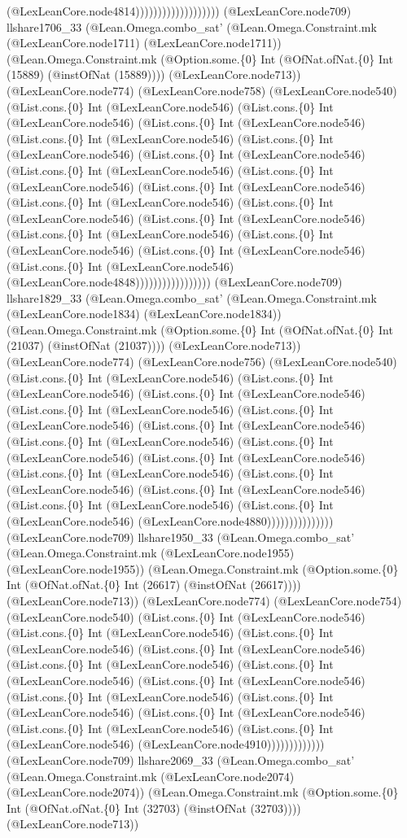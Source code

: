 \documentclass[11pt]{article}
\begin{document}
(@LexLeanCore.node4814))))))))))))))))))) (@LexLeanCore.node709) llshare1706\_33 (@Lean.Omega.combo\_sat' (@Lean.Omega.Constraint.mk (@LexLeanCore.node1711) (@LexLeanCore.node1711)) (@Lean.Omega.Constraint.mk (@Option.some.\{0\} Int (@OfNat.ofNat.\{0\} Int (15889) (@instOfNat (15889)))) (@LexLeanCore.node713)) (@LexLeanCore.node774) (@LexLeanCore.node758) (@LexLeanCore.node540) (@List.cons.\{0\} Int (@LexLeanCore.node546) (@List.cons.\{0\} Int (@LexLeanCore.node546) (@List.cons.\{0\} Int (@LexLeanCore.node546) (@List.cons.\{0\} Int (@LexLeanCore.node546) (@List.cons.\{0\} Int (@LexLeanCore.node546) (@List.cons.\{0\} Int (@LexLeanCore.node546) (@List.cons.\{0\} Int (@LexLeanCore.node546) (@List.cons.\{0\} Int (@LexLeanCore.node546) (@List.cons.\{0\} Int (@LexLeanCore.node546) (@List.cons.\{0\} Int (@LexLeanCore.node546) (@List.cons.\{0\} Int (@LexLeanCore.node546) (@List.cons.\{0\} Int (@LexLeanCore.node546) (@List.cons.\{0\} Int (@LexLeanCore.node546) (@List.cons.\{0\} Int (@LexLeanCore.node546) (@List.cons.\{0\} Int (@LexLeanCore.node546) (@List.cons.\{0\} Int (@LexLeanCore.node546) (@LexLeanCore.node4848))))))))))))))))) (@LexLeanCore.node709) llshare1829\_33 (@Lean.Omega.combo\_sat' (@Lean.Omega.Constraint.mk (@LexLeanCore.node1834) (@LexLeanCore.node1834)) (@Lean.Omega.Constraint.mk (@Option.some.\{0\} Int (@OfNat.ofNat.\{0\} Int (21037) (@instOfNat (21037)))) (@LexLeanCore.node713)) (@LexLeanCore.node774) (@LexLeanCore.node756) (@LexLeanCore.node540) (@List.cons.\{0\} Int (@LexLeanCore.node546) (@List.cons.\{0\} Int (@LexLeanCore.node546) (@List.cons.\{0\} Int (@LexLeanCore.node546) (@List.cons.\{0\} Int (@LexLeanCore.node546) (@List.cons.\{0\} Int (@LexLeanCore.node546) (@List.cons.\{0\} Int (@LexLeanCore.node546) (@List.cons.\{0\} Int (@LexLeanCore.node546) (@List.cons.\{0\} Int (@LexLeanCore.node546) (@List.cons.\{0\} Int (@LexLeanCore.node546) (@List.cons.\{0\} Int (@LexLeanCore.node546) (@List.cons.\{0\} Int (@LexLeanCore.node546) (@List.cons.\{0\} Int (@LexLeanCore.node546) (@List.cons.\{0\} Int (@LexLeanCore.node546) (@List.cons.\{0\} Int (@LexLeanCore.node546) (@LexLeanCore.node4880))))))))))))))) (@LexLeanCore.node709) llshare1950\_33 (@Lean.Omega.combo\_sat' (@Lean.Omega.Constraint.mk (@LexLeanCore.node1955) (@LexLeanCore.node1955)) (@Lean.Omega.Constraint.mk (@Option.some.\{0\} Int (@OfNat.ofNat.\{0\} Int (26617) (@instOfNat (26617)))) (@LexLeanCore.node713)) (@LexLeanCore.node774) (@LexLeanCore.node754) (@LexLeanCore.node540) (@List.cons.\{0\} Int (@LexLeanCore.node546) (@List.cons.\{0\} Int (@LexLeanCore.node546) (@List.cons.\{0\} Int (@LexLeanCore.node546) (@List.cons.\{0\} Int (@LexLeanCore.node546) (@List.cons.\{0\} Int (@LexLeanCore.node546) (@List.cons.\{0\} Int (@LexLeanCore.node546) (@List.cons.\{0\} Int (@LexLeanCore.node546) (@List.cons.\{0\} Int (@LexLeanCore.node546) (@List.cons.\{0\} Int (@LexLeanCore.node546) (@List.cons.\{0\} Int (@LexLeanCore.node546) (@List.cons.\{0\} Int (@LexLeanCore.node546) (@List.cons.\{0\} Int (@LexLeanCore.node546) (@LexLeanCore.node4910))))))))))))) (@LexLeanCore.node709) llshare2069\_33 (@Lean.Omega.combo\_sat' (@Lean.Omega.Constraint.mk (@LexLeanCore.node2074) (@LexLeanCore.node2074)) (@Lean.Omega.Constraint.mk (@Option.some.\{0\} Int (@OfNat.ofNat.\{0\} Int (32703) (@instOfNat (32703)))) (@LexLeanCore.node713)) 
\end{document}
